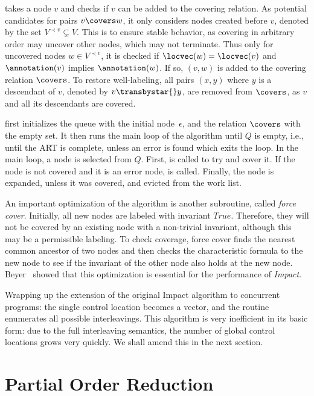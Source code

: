 \documentclass[conference]{IEEEtran}
\begin{document}
 takes a node $v$ and checks if $v$ can be added to the covering
     relation.  As potential candidates for pairs $v \covers w$, it only
     considers nodes created before $v$, denoted by the set $V^{\prec
     v}\subsetneq V$.  This is to ensure stable behavior, as covering in
     arbitrary order may uncover other nodes, which may not terminate.  Thus
     only for uncovered nodes $w \in V^{\prec v}$, it is checked if
     $\locvec(w)=\locvec(v)$ and $\annotation(v)$ implies $\annotation(w)$. 
     If so, $(v,w)$ is added to the covering relation $\covers$.  To restore
     well-labeling, all pairs $(x,y)$ where $y$ is a descendant of $v$,
     denoted by $v\transbystar{} y$, are removed from $\covers$, as $v$ and
     all its descendants are covered.

 first initializes the queue with the initial node~$\epsilon$,
     and the relation $\covers$ with the empty set.  It then runs the main
     loop of the algorithm until $Q$ is empty, i.e., until the ART is
     complete, unless an error is found which exits the loop.  In the main
     loop, a node is selected from $Q$.  First,  is called to try
     and cover it.  If the node is not covered and it is an error node,
      is called.  Finally, the node is expanded, unless it was
     covered, and evicted from the work list.
           
An important optimization of the algorithm is another subroutine, called
\emph{force cover}.  Initially, all new nodes are labeled with invariant
$\mathit{True}$.  Therefore, they will not be covered by an existing node
with a non-trivial invariant, although this may be a permissible labeling. 
To check coverage, force cover finds the nearest common ancestor of two
nodes and then checks the characteristic formula to the new node to see if
the invariant of the other node also holds at the new node.  
Beyer~\cite{DBLP:conf/fmcad/BeyerW12}
showed that this optimization is essential for the performance of \emph{Impact}.

Wrapping up the extension of the original Impact algorithm to concurrent
programs: the single control location becomes a vector, and the
 routine enumerates all possible interleavings.  
This algorithm is very inefficient in its basic form: due to the full interleaving
semantics, the number of global control locations grows very quickly.  
We shall amend this in the next section.


\section{Partial Order Reduction}
\label{sec:partial}
\end{document}
